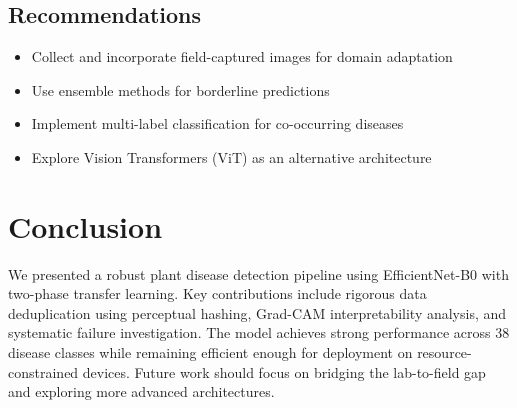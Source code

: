 \documentclass[12pt, a4paper]{article}
\begin{document}
\subsection{Recommendations}
\begin{itemize}[noitemsep]
    \item Collect and incorporate field-captured images for domain adaptation
    \item Use ensemble methods for borderline predictions
    \item Implement multi-label classification for co-occurring diseases
    \item Explore Vision Transformers (ViT) as an alternative architecture
\end{itemize}

\section{Conclusion}

We presented a robust plant disease detection pipeline using EfficientNet-B0 with two-phase transfer learning. Key contributions include rigorous data deduplication using perceptual hashing, Grad-CAM interpretability analysis, and systematic failure investigation. The model achieves strong performance across 38 disease classes while remaining efficient enough for deployment on resource-constrained devices. Future work should focus on bridging the lab-to-field gap and exploring more advanced architectures.
\end{document}
